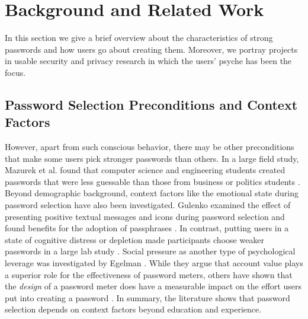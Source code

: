 \section{Background and Related Work}
In this section we give a brief overview about the characteristics of strong passwords and how users go about creating them. Moreover, we portray projects in usable security and privacy research in which the users' psyche has been the focus. 



\subsection{Password Selection Preconditions and Context Factors}
However, apart from such conscious behavior, there may be other preconditions that make some users pick stronger passwords than others. In a large field study, Mazurek et al. found that computer science and engineering students created passwords that were less guessable than those from business or politics students \cite{Mazurek2013Measuring}. Beyond demographic background, context factors like the emotional state during password selection have also been investigated. 
Gulenko examined the effect of presenting positive textual messages and icons during password selection and found benefits for the adoption of passphrases \cite{Gulenko2014PasswordsEmotion}. In contrast, putting users in a state of cognitive distress or depletion made participants choose weaker passwords in a large lab study \cite{Gross2016EffectCognitiveEffort}. 
Social pressure as another type of psychological leverage was investigated by Egelman \etal \cite{Egelman2013DoesMyPasswordGoUpToEleven}. While they argue that account value plays a superior role for the effectiveness of password meters, others have shown that the \textit{design} of a password meter does have a measurable impact on the effort users put into creating a password \cite{Ur2012HowDoesYourPasswordMeasureUp}. In summary, the literature shows that password selection depends on context factors beyond education and experience. 
